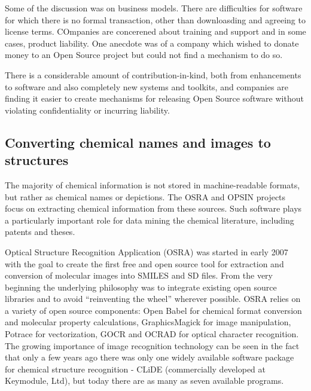 \documentclass[10pt]{bmc_article}
\newenvironment{bmcformat}{\fussy\setboolean{publ}{true}}{\fussy}
\begin{document}
\begin{bmcformat}
Some of the discussion was on business models. There are difficulties
for software for which there is no formal
transaction, other than downloasding and agreeing to license terms.
COmpanies are concerened about training and support
and in some cases, product liability. One anecdote was of a company
which wished to donate money to an Open Source
project but could not find a mechanism to do so.

There is a considerable amount of contribution-in-kind, both from
enhancements to software and also completely new
systems and toolkits, and companies are finding it easier to create
mechanisms for releasing Open Source software
without violating confidentiality or incurring liability.


\subsection*{Converting chemical names and images to structures}

The majority of chemical information is not stored in machine-readable
formats, but rather as chemical names or depictions. The OSRA and OPSIN
projects focus on extracting chemical information from these sources.
Such software plays a particularly important role for data mining the
chemical literature, including patents and theses.

Optical Structure Recognition Application (OSRA) \cite{WebOSRA} was started
in early 2007 with the goal to create the first free and open source
tool for extraction and conversion of molecular images into SMILES and
SD files. From the very beginning the underlying philosophy was to integrate
existing open source libraries and to avoid ``reinventing the wheel''
wherever possible. OSRA relies on a variety of open source components:
Open Babel for chemical format
conversion and molecular property calculations, GraphicsMagick for image
manipulation, Potrace for vectorization, GOCR and OCRAD for optical
character recognition. The growing importance of image
recognition technology can be seen in the fact that
only a few years ago there was only one widely available software
package for chemical structure recognition -  CLiDE (commercially
developed at Keymodule, Ltd), but today there are as many as seven
available programs.


\end{bmcformat}
\end{document}

